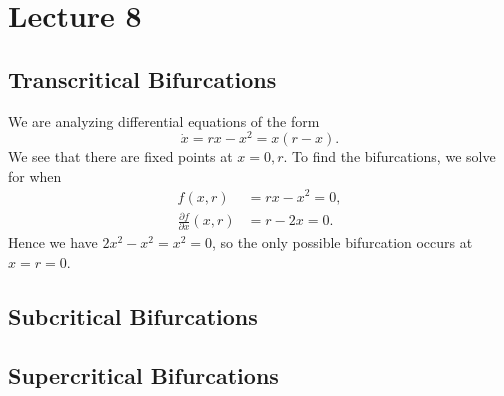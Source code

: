 \documentclass[class=article, crop=false]{standalone}
\begin{document}
  \section{Lecture 8}
  \subsection{Transcritical Bifurcations}
  We are analyzing differential equations of the form
  \[
    \dot{x} = rx - x^2 = x(r - x).
  \]
  We see that there are fixed points at $x = 0, r$. To find the bifurcations, we solve for when
  \begin{align*}
    f(x, r) &= rx - x^2 = 0, \\
    \frac{\partial f}{\partial x}(x, r) &= r - 2x = 0.
  \end{align*}
  Hence we have $2x^2 - x^2 = x^2 = 0$, so the only possible bifurcation occurs at $x = r = 0$.
  \subsection{Subcritical Bifurcations}
  \subsection{Supercritical Bifurcations}
\end{document}
